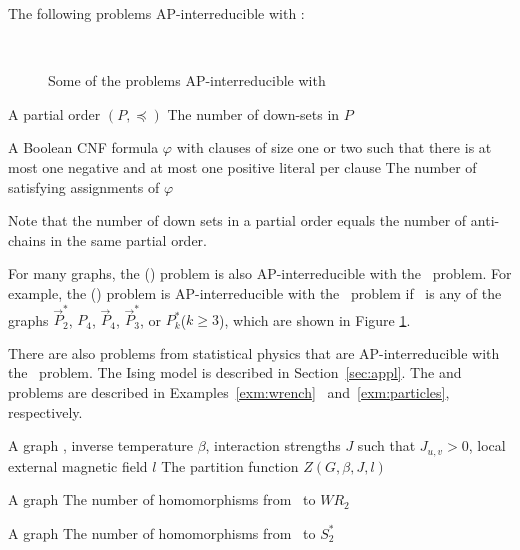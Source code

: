 The following problems AP-interreducible with \cbis:

\begin{figure}[h]
\centering
\subfigure[\(\vec{P}^*_2\)]{\label{fig:ds}}\hfill 
\subfigure[\(P_4\)]{\label{fig:p4}}\hfill
\subfigure[Oriented \(P_4\)] {\label{fig:dp4}}\\
\subfigure[\(\vec{P}^*_3\)]{\label{fig:dps3}}\hfill
\subfigure[\(P^*_k\)]{\label{fig:psk}}
\caption{Some of the problems AP-interreducible with \cbis}
\label{fig:bisred}
\end{figure} 

\pdef{\cds}
{A partial order \((P,\preceq)\)}
{The number of down-sets in \(P\)}

{A Boolean CNF formula \(\varphi\) with clauses of size one or two such that
there is at most one negative and at most one positive literal per clause}
{The number of satisfying assignments of \(\varphi\)}

Note that the number of down sets in a partial order equals
the number of anti-chains in the same partial order. 

For many graphs, the \chom(\mH) problem is also AP-interreducible with the \cbis\ problem.
For example, the \chom(\mH) problem is AP-interreducible with the \cbis\ problem
if \mH\ is any of the graphs \(\vec{P}^*_2\), \(P_4\), \(\vec{P}_4\), \(\vec{P}^*_3\),
or \(P^*_k\)(\(k\ge 3\)), which are shown in Figure \ref{fig:bisred}\@.
 
There are also problems from statistical physics that are AP-interreducible with the \cbis\
problem. The Ising model is described in Section~\ref{sec:appl}.
The \pname{\#2-Wrench-Coloring}
and  problems are described in Examples~\ref{exm:wrench}~
and~\ref{exm:particles}, respectively.

{A graph \mG, inverse temperature \(\beta\), interaction strengths \(J\) such that
\(J_{u,v} > 0\), local external magnetic field \(l\)}
{The partition function \(Z(G,\beta,J,l)\)}

{A graph \mG}
{The number of homomorphisms from \mG\ to \(WR_2\)}

{A graph \mG}
{The number of homomorphisms from \mG\ to \(S^*_2\)}


